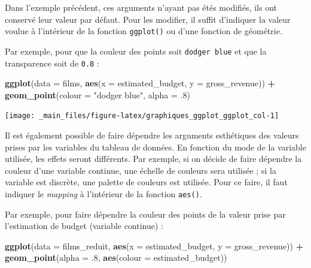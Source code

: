 \documentclass[
  11pt,
]{book}
\newenvironment{Shaded}{\begin{snugshade}}{\end{snugshade}}
\newcommand{\DataTypeTok}[1]{\textcolor[rgb]{0.13,0.29,0.53}{#1}}
\newcommand{\FloatTok}[1]{\textcolor[rgb]{0.00,0.00,0.81}{#1}}
\newcommand{\KeywordTok}[1]{\textcolor[rgb]{0.13,0.29,0.53}{\textbf{#1}}}
\newcommand{\NormalTok}[1]{#1}
\newcommand{\OperatorTok}[1]{\textcolor[rgb]{0.81,0.36,0.00}{\textbf{#1}}}
\newcommand{\StringTok}[1]{\textcolor[rgb]{0.31,0.60,0.02}{#1}}
\numberwithin{equation}{section}
\numberwithin{countremarque}{section}
\begin{document}
Dans l'exemple précédent, ces arguments n'ayant pas étés modifiés, ils ont conservé leur valeur par défaut. Pour les modifier, il suffit d'indiquer la valeur voulue à l'intérieur de la fonction \texttt{ggplot()} ou d'une fonction de géométrie.

Par exemple, pour que la couleur des points soit \texttt{dodger\ blue} et que la transparence soit de \texttt{0.8} :

\begin{Shaded}
\begin{Highlighting}[]
\KeywordTok{ggplot}\NormalTok{(}\DataTypeTok{data =}\NormalTok{ films,}
       \KeywordTok{aes}\NormalTok{(}\DataTypeTok{x =}\NormalTok{ estimated\_budget, }\DataTypeTok{y =}\NormalTok{ gross\_revenue)) }\OperatorTok{+}
\StringTok{  }\KeywordTok{geom\_point}\NormalTok{(}\DataTypeTok{colour =} \StringTok{"dodger blue"}\NormalTok{, }\DataTypeTok{alpha =} \FloatTok{.8}\NormalTok{)}
\end{Highlighting}
\end{Shaded}

\begin{center}\texttt{[image: \_main\_files/figure-latex/graphiques\_ggplot\_ggplot\_col-1]} \end{center}

Il est également possible de faire dépendre les arguments esthétiques des valeurs prises par les variables du tableau de données. En fonction du mode de la variable utilisée, les effets seront différents. Par exemple, si on décide de faire dépendre la couleur d'une variable continue, une échelle de couleurs sera utilisée ; si la variable est discrète, une palette de couleurs est utilisée. Pour ce faire, il faut indiquer le \emph{mapping} à l'intérieur de la fonction \texttt{aes()}.

Par exemple, pour faire dépendre la couleur des points de la valeur prise par l'estimation de budget (variable continue) :

\begin{Shaded}
\begin{Highlighting}[]
\KeywordTok{ggplot}\NormalTok{(}\DataTypeTok{data =}\NormalTok{ films\_reduit,}
       \KeywordTok{aes}\NormalTok{(}\DataTypeTok{x =}\NormalTok{ estimated\_budget, }\DataTypeTok{y =}\NormalTok{ gross\_revenue)) }\OperatorTok{+}
\StringTok{  }\KeywordTok{geom\_point}\NormalTok{(}\DataTypeTok{alpha =} \FloatTok{.8}\NormalTok{, }\KeywordTok{aes}\NormalTok{(}\DataTypeTok{colour =}\NormalTok{ estimated\_budget))}
\end{Highlighting}
\end{Shaded}
\end{document}
